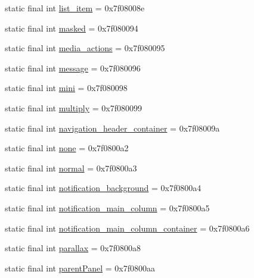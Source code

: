 \begin{DoxyCompactItemize}
static final int \mbox{\hyperlink{classandroid_1_1support_1_1design_1_1R_1_1id_aeeec2bcf1f8afaf2c5f7a49c7563a3a0}{list\+\_\+item}} = 0x7f08008e
\item 
static final int \mbox{\hyperlink{classandroid_1_1support_1_1design_1_1R_1_1id_afc81163bf733b0dbd07b3b42bbd7c787}{masked}} = 0x7f080094
\item 
static final int \mbox{\hyperlink{classandroid_1_1support_1_1design_1_1R_1_1id_aed56f430ded713604804f6ef2e52001f}{media\+\_\+actions}} = 0x7f080095
\item 
static final int \mbox{\hyperlink{classandroid_1_1support_1_1design_1_1R_1_1id_ab58c404e690499850326c54532b67d90}{message}} = 0x7f080096
\item 
static final int \mbox{\hyperlink{classandroid_1_1support_1_1design_1_1R_1_1id_a88811cbf51e1d607ab0468ba99937bd6}{mini}} = 0x7f080098
\item 
static final int \mbox{\hyperlink{classandroid_1_1support_1_1design_1_1R_1_1id_a134f5f17353ed21214390ab7ea4dff8b}{multiply}} = 0x7f080099
\item 
static final int \mbox{\hyperlink{classandroid_1_1support_1_1design_1_1R_1_1id_a4ba0611713d8d7328f336a8220b88f33}{navigation\+\_\+header\+\_\+container}} = 0x7f08009a
\item 
static final int \mbox{\hyperlink{classandroid_1_1support_1_1design_1_1R_1_1id_a9408d8d9326a8268cca9848a4f0c4264}{none}} = 0x7f0800a2
\item 
static final int \mbox{\hyperlink{classandroid_1_1support_1_1design_1_1R_1_1id_a075ec293abae4b6570743febf3eb6b3e}{normal}} = 0x7f0800a3
\item 
static final int \mbox{\hyperlink{classandroid_1_1support_1_1design_1_1R_1_1id_aac8da5dddb77215b07e2bc84bd1b22d2}{notification\+\_\+background}} = 0x7f0800a4
\item 
static final int \mbox{\hyperlink{classandroid_1_1support_1_1design_1_1R_1_1id_a7c01e843bd2f6524e2c4d59abda44b3f}{notification\+\_\+main\+\_\+column}} = 0x7f0800a5
\item 
static final int \mbox{\hyperlink{classandroid_1_1support_1_1design_1_1R_1_1id_aeb6b68e9fe2941575be7ed8a5e43b858}{notification\+\_\+main\+\_\+column\+\_\+container}} = 0x7f0800a6
\item 
static final int \mbox{\hyperlink{classandroid_1_1support_1_1design_1_1R_1_1id_a9188f01eb52456eb2965c39dc691e444}{parallax}} = 0x7f0800a8
\item 
static final int \mbox{\hyperlink{classandroid_1_1support_1_1design_1_1R_1_1id_a298108f25bd760f5b125688096d0de14}{parent\+Panel}} = 0x7f0800aa

\end{DoxyCompactItemize}
